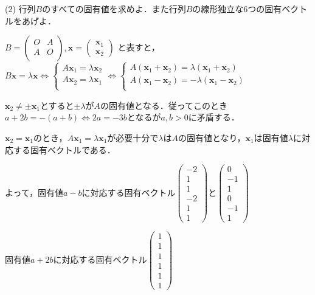 \documentclass[a4j]{jarticle}
\let \ds \displaystyle
\begin{document}
\begin{screen}
 (2) 行列$B$のすべての固有値を求めよ．また行列$B$の線形独立な6つの固有ベクトルをあげよ．
\end{screen}

$\ds B =
\left(
\begin{array}{c|c}
 O&A \\
 \hline
 A&O \\
\end{array}
\right),
\bm{x} =
\left(
\begin{array}{c}
 \bm{x}_1\\ \hline 
 \bm{x}_2
\end{array}
\right)$ と表すと，$B\bm{x}=\lambda \bm{x} \Leftrightarrow
\begin{cases}
 A \bm{x}_1 = \lambda \bm{x}_2 \\
 A \bm{x}_2 = \lambda \bm{x}_1 \\
\end{cases}
\Leftrightarrow
\begin{cases}
 A (\bm{x}_1+\bm{x}_2) = \lambda(\bm{x}_1+\bm{x}_2) \\
 A (\bm{x}_1-\bm{x}_2) = -\lambda(\bm{x}_1-\bm{x}_2) \\
\end{cases}
$ 

$\bm{x}_2 \neq \pm \bm{x}_1 $とすると$\pm \lambda$が$A$の固有値となる．従ってこのとき$a+2b=-(a+b) \Leftrightarrow 2a=-3b$となるが$a,b>0$に矛盾する．

$\bm{x}_2 = \bm{x}_1$のとき，$A \bm{x}_1 = \lambda \bm{x}_1$が必要十分で$\lambda$は$A$の固有値となり，$\bm{x}_1$は固有値$\lambda$に対応する固有ベクトルである．

よって，固有値$a-b$に対応する固有ベクトル$\left(\begin{array}{c}-2\\1\\1\\-2\\1\\1\end{array}\right)$と$\left(\begin{array}{c}0\\-1\\1\\0\\-1\\1\end{array}\right)$

固有値$a+2b$に対応する固有ベクトル$\left(\begin{array}{c}1\\1\\1\\1\\1\\1\end{array}\right)$
\end{document}
